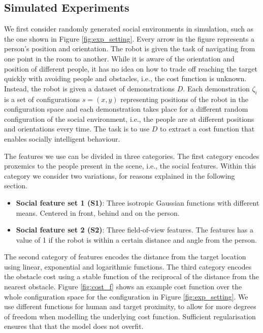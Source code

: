 \documentclass[letterpaper, 10 pt, conference]{ieeeconf}
\begin{document}
	\subsection{Simulated Experiments}
	We first consider randomly generated social environments in simulation, such as the one shown in Figure \ref{fig:exp_setting}. Every arrow in the figure represents a person's position and orientation. The robot is given the task of navigating from one point in the room to another. While it is aware of the orientation and position of different people, it has no idea on how to trade off reaching the target quickly with avoiding people and obstacles, i.e., the cost function is unknown. Instead, the robot is given a dataset of demonstrations $D$. Each demonstration $\zeta_i$ is a set of configurations $s = (x,y)$ representing positions of the robot in the configuration space and each demonstration takes place for a different random configuration of the social environment, i.e., the people are at different positions and orientations every time. The task is to use $D$ to extract a cost function that enables socially intelligent behaviour.

	The features we use can be divided in three categories. The first category encodes proxemics to the people present in the scene, i.e., the social features. Within this category we consider two variations, for reasons explained in the following section.
	\begin{itemize}
		\item {\bf Social feature set 1 (S1)}: Three isotropic Gaussian functions with different means. Centered in front, behind and on the person.
		\item {\bf Social feature set 2 (S2)}: Three field-of-view features. The features has a value of 1 if the robot is within a certain distance and angle from the person.
	\end{itemize}
	  The second category of features encodes the distance from the target location using linear, exponential and logarithmic functions. The third category encodes the obstacle cost using a stable function of the reciprocal of the distance from the nearest obstacle. Figure \ref{fig:cost_f} shows an example cost function over the whole configuration space for the configuration in Figure \ref{fig:exp_setting}. We use different functions for human and target proximity, to allow for more degrees of freedom when modelling the underlying cost function. Sufficient regularisation ensures that that the model does not overfit.
\end{document}
